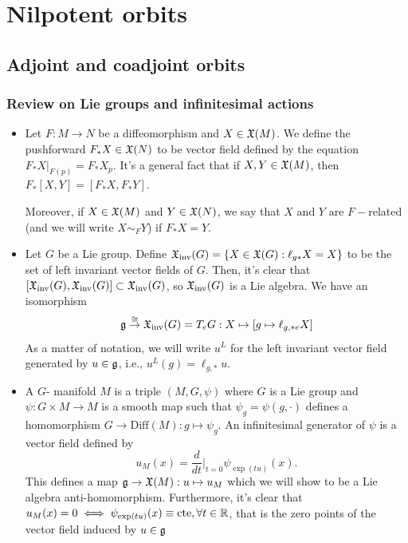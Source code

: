 \chapter{Nilpotent orbits}
\section{Adjoint and coadjoint orbits}
\subsection{Review on Lie groups and infinitesimal actions}
\begin{itemize}
    \item Let $F:M\rightarrow N$ be a diffeomorphism and $X\in\mathfrak{X}(M)$. We define the pushforward 
    $F_*X\in\mathfrak{X}(N)$ to be vector field defined by the equation $F_*X |_{F(p)}=F_*X_p$. It's a general fact that 
    if $X,Y\in\mathfrak{X}(M)$, then $F_*[X,Y]=[F_*X,F_*Y]$.\par 
    Moreover, if $X\in\mathfrak{X}(M)$ and $Y\in\mathfrak{X}(N)$, we say that $X$ and $Y$ are $F-$related (and we will write 
    $X\sim_FY$) if $F_*X=Y$.
    \item Let $G$ be a Lie group. Define $\mathfrak{X}_{\text{inv}}(G)=\{X\in\mathfrak{X}(G):\ell_{g*}X=X\}$ to be the set of 
    left invariant vector fields of $G$. Then, it's clear that 
    $[\mathfrak{X}_{\text{inv}}(G),\mathfrak{X}_{\text{inv}}(G)]\subset \mathfrak{X}_{\text{inv}}(G)$, so $\mathfrak{X}_{\text{inv}}(G)$ is a 
    Lie algebra. We have an isomorphism 
    \begin{equation}
        \mathfrak{g}\overset{\cong}{\to}\mathfrak{X}_{\text{inv}}(G)=T_eG: X\mapsto [g\mapsto \ell_{g,*e}X]
    \end{equation}
    As a matter of notation, we will write $u^L$ for the left invariant vector field generated by $u\in\mathfrak{g}$, i.e.,
    $u^L(g)=\ell_{g,*}u$.
    \item A $G$- manifold $M$ is a triple $(M,G,\psi)$ where $G$ is a Lie group and 
    $\psi:G\times M\to M$ is a smooth map such that $\psi_g=\psi(g,\cdot)$ defines a homomorphism 
    $G\to\text{Diff}(M):g\mapsto \psi_g$. An infinitesimal generator of $\psi$ is a vector field defined by 
    \begin{equation}
        u_M(x)=\frac{d}{dt}\bigg|_{t=0}\psi_{\exp(tu)}(x).
    \end{equation}
    This defines a map $\mathfrak{g}\to\mathfrak{X}(M):u\mapsto u_M$ which we will show to be a Lie algebra anti-homomorphism. Furthermore, 
    it's clear that $u_M(x)=0\iff \psi_{\exp(tu)}(x)\equiv \text{cte},\forall t\in\mathbb{R}$, that is the zero points of the vector field induced by $u\in\mathfrak{g}$

\end{itemize}
